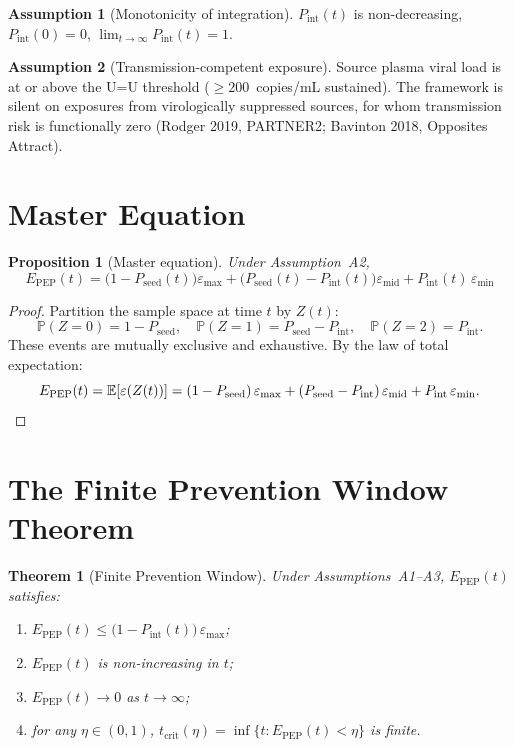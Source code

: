 \documentclass[11pt]{article}
\newtheorem{theorem}{Theorem}[section]
\newtheorem{proposition}{Proposition}[section]
\theoremstyle{definition}
\newtheorem{assumption}{Assumption}[section]
\theoremstyle{remark}
\newcommand{\Pseed}{P_{\text{seed}}}
\newcommand{\Pint}{P_{\text{int}}}
\newcommand{\Epep}{E_{\text{PEP}}}
\newcommand{\tcrit}{t_{\text{crit}}}
\newcommand{\emax}{\varepsilon_{\max}}
\newcommand{\emid}{\varepsilon_{\text{mid}}}
\newcommand{\emin}{\varepsilon_{\min}}
\begin{document}
\begin{assumption}[Monotonicity of integration]
$\Pint(t)$ is non-decreasing, $\Pint(0) = 0$, $\lim_{t\to\infty} \Pint(t) = 1$.
\end{assumption}

\begin{assumption}[Transmission-competent exposure]
Source plasma viral load is at or above the U=U threshold ($\geq 200$~copies/mL sustained). The framework is silent on exposures from virologically suppressed sources, for whom transmission risk is functionally zero (Rodger 2019, PARTNER2; Bavinton 2018, Opposites Attract).
\end{assumption}

\section{Master Equation}

\begin{proposition}[Master equation]\label{prop:master}
Under Assumption~A2,
\begin{equation}
\Epep(t) = \big(1 - \Pseed(t)\big)\emax + \big(\Pseed(t) - \Pint(t)\big)\emid + \Pint(t)\,\emin
\label{eq:master_si}
\end{equation}
\end{proposition}

\begin{proof}
Partition the sample space at time $t$ by $Z(t)$:
\[
\mathbb{P}(Z = 0) = 1 - \Pseed,\quad
\mathbb{P}(Z = 1) = \Pseed - \Pint,\quad
\mathbb{P}(Z = 2) = \Pint.
\]
These events are mutually exclusive and exhaustive. By the law of total expectation:
\[
\Epep(t) = \mathbb{E}[\varepsilon(Z(t))] = (1 - \Pseed)\,\emax + (\Pseed - \Pint)\,\emid + \Pint\,\emin. \qedhere
\]
\end{proof}

\section{The Finite Prevention Window Theorem}

\begin{theorem}[Finite Prevention Window]\label{thm:finite}
Under Assumptions~A1--A3, $\Epep(t)$ satisfies:
\begin{enumerate}[label=\textnormal{(\roman*)},leftmargin=2.5em]
    \item $\Epep(t) \leq \big(1 - \Pint(t)\big)\,\emax$;
    \item $\Epep(t)$ is non-increasing in $t$;
    \item $\Epep(t) \to 0$ as $t \to \infty$;
    \item for any $\eta \in (0,1)$, $\tcrit(\eta) = \inf\{t : \Epep(t) < \eta\}$ is finite.
\end{enumerate}
\end{theorem}
\end{document}
